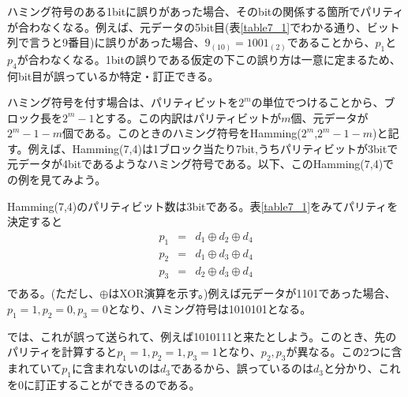 ハミング符号のある1bitに誤りがあった場合、そのbitの関係する箇所でパリティが合わなくなる。例えば、元データの5bit目(表\ref{table7_1}でわかる通り、ビット列で言うと9番目)に誤りがあった場合、$9_{(10)}=1001_{(2)}$であることから、$p_1$と$p_4$が合わなくなる。1bitの誤りである仮定の下この誤り方は一意に定まるため、何bit目が誤っているか特定・訂正できる。

ハミング符号を付す場合は、パリティビットを$2^m$の単位でつけることから、ブロック長を$2^m-1$とする。この内訳はパリティビットが$m$個、元データが$2^m-1-m$個である。このときのハミング符号をHamming($2^m$,$2^m-1-m$)と記す。例えば、Hamming(7,4)は1ブロック当たり7bit,うちパリティビットが3bitで元データが4bitであるようなハミング符号である。以下、このHamming(7,4)での例を見てみよう。

Hamming(7,4)のパリティビット数は3bitである。表\ref{table7_1}をみてパリティを決定すると
\begin{eqnarray*}
p_1&=&d_1 \oplus d_2 \oplus d_4 \\
p_2&=&d_1 \oplus d_3 \oplus d_4 \\
p_3&=&d_2 \oplus d_3 \oplus d_4 \\
\end{eqnarray*}
である。(ただし、$\oplus$はXOR演算を示す。)例えば元データが1101であった場合、$p_1=1,p_2=0,p_3=0$となり、ハミング符号は1010101となる。

では、これが誤って送られて、例えば1010111と来たとしよう。このとき、先のパリティを計算すると$p_1=1,p_2=1,p_3=1$となり、$p_2,p_3$が異なる。この2つに含まれていて$p_1$に含まれないのは$d_3$であるから、誤っているのは$d_3$と分かり、これを0に訂正することができるのである。

